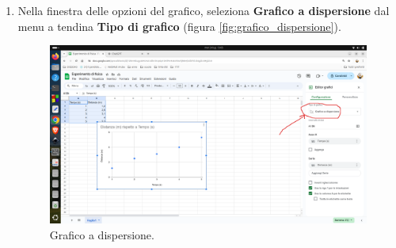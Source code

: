 \documentclass[12pt,a4paper,oneside]{book}
\theoremstyle{esercizio}
\begin{document}
\begin{enumerate}
    
    
    \item Nella finestra delle opzioni del grafico, seleziona \textbf{Grafico a dispersione} dal menu a tendina \textbf{Tipo di grafico} (figura \ref{fig:grafico_dispersione}).
    
   \begin{figure}[h!]
    \centering
    \includegraphics[width=\linewidth]{path_to_image/dispersione.png} 
    \caption{Grafico a dispersione.}
            \label{fig:dispersione}
\end{figure} 
\end{enumerate}
\end{document}
